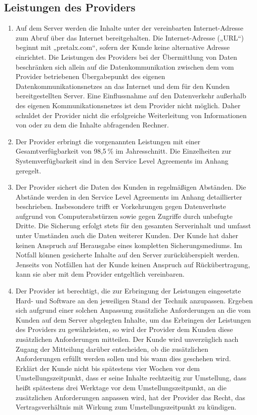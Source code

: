 \documentclass{terms}
\begin{document}
\subsection{Leistungen des Providers}
\begin{enumerate}
\item Auf dem Server werden die Inhalte unter der vereinbarten Internet-Adresse zum Abruf über das Internet bereitgehalten.
      Die Internet-Adresse („URL“) beginnt mit „pretalx.com“, sofern der Kunde keine alternative Adresse einrichtet.
      Die Leistungen des Providers bei der Übermittlung von Daten beschränken sich allein auf die Datenkommunikation zwischen dem vom Provider betriebenen Übergabepunkt des eigenen Datenkommunikationsnetzes an das Internet und dem für den Kunden bereitgestellten Server.
      Eine Einflussnahme auf den Datenverkehr außerhalb des eigenen Kommunikationsnetzes ist dem Provider nicht möglich.
      Daher schuldet der Provider nicht die erfolgreiche Weiterleitung von Informationen von oder zu dem die Inhalte abfragenden Rechner.
\item Der Provider erbringt die vorgenannten Leistungen mit einer Gesamtverfügbarkeit von 98,5 \% im Jahresschnitt.
      Die Einzelheiten zur Systemverfügbarkeit sind in den Service Level Agreements im Anhang geregelt.
\item Der Provider sichert die Daten des Kunden in regelmäßigen Abständen.
      Die Abstände werden in den Service Level Agreements im Anhang detaillierter beschrieben.
      Insbesondere trifft er Vorkehrungen gegen Datenverluste aufgrund von Computerabstürzen sowie gegen Zugriffe durch unbefugte Dritte.
      Die Sicherung erfolgt stets für den gesamten Serverinhalt und umfasst unter Umständen auch die Daten weiterer Kunden.
      Der Kunde hat daher keinen Anspruch auf Herausgabe eines kompletten Sicherungsmediums.
      Im Notfall können gesicherte Inhalte auf den Server zurücküberspielt werden.
      Jenseits von Notfällen hat der Kunde keinen Anspruch auf Rückübertragung, kann sie aber mit dem Provider entgeltlich vereinbaren.
\item Der Provider ist berechtigt, die zur Erbringung der Leistungen eingesetzte Hard- und Software an den jeweiligen Stand der Technik anzupassen.
      Ergeben sich aufgrund einer solchen Anpassung zusätzliche Anforderungen an die vom Kunden auf dem Server abgelegten Inhalte, um das Erbringen der Leistungen des Providers zu gewährleisten, so wird der Provider dem Kunden diese zusätzlichen Anforderungen mitteilen.
      Der Kunde wird unverzüglich nach Zugang der Mitteilung darüber entscheiden, ob die zusätzlichen Anforderungen erfüllt werden sollen und bis wann dies geschehen wird.
      Erklärt der Kunde nicht bis spätestens vier Wochen vor dem Umstellungszeitpunkt, dass er seine Inhalte rechtzeitig zur Umstellung, dass heißt spätestens drei Werktage vor dem Umstellungszeitpunkt, an die zusätzlichen Anforderungen anpassen wird, hat der Provider das Recht, das Vertragsverhältnis mit Wirkung zum Umstellungszeitpunkt zu kündigen.
\end{enumerate}
\end{document}
